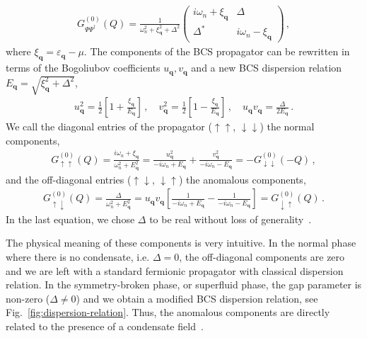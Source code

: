 \begin{align}
	\label{eq:bcs-propagator}
	G^{(0)}_{\Psi\Psi^{\dagger}}(Q) = \frac{1}{\omega_n^2+\xi_{\bm{q}}^2+\Delta^2}
	\begin{pmatrix} i\omega_n+\xi_{\bm{q}} & \Delta \\
	\Delta^* & i\omega_n-\xi_{\bm{q}} \end{pmatrix} \,,
\end{align}
where $\xi_{\bm{q}}=\varepsilon_{\bm{q}}-\mu$. The components of the BCS propagator can be rewritten in terms of the Bogoliubov coefficients $u_{\bm{q}}, v_{\bm{q}}$ and a new BCS dispersion relation $E_{\bm{q}}=\sqrt{\xi_{\bm{q}}^2+\Delta^2}$,
%
\begin{align}
	\label{eq:bogoliubov-coefficients}
	u_{\bm{q}}^2 = \frac{1}{2}\left[1 + \frac{\xi_{\bm{q}}}{E_{\bm{q}}}\right] \,, \quad
	v_{\bm{q}}^2 = \frac{1}{2}\left[1 - \frac{\xi_{\bm{q}}}{E_{\bm{q}}}\right] \,, \quad
	u_{\bm{q}} v_{\bm{q}} = \frac{\Delta}{2E_{\bm{q}}} \,.
\end{align}
%
We call the diagonal entries of the propagator ($\uparrow\uparrow$, $\downarrow\downarrow$) the normal components,
%
\begin{align}
	\label{eq:normal-components}
	G^{(0)}_{\uparrow\uparrow}(Q) = \frac{i\omega_n+\xi_{\bm{q}}}{\omega_n^2+E_{\bm{q}}^2} = \frac{u_{\bm{q}}^2}{-i\omega_n+E_{\bm{q}}} + \frac{v_{\bm{q}}^2}{-i\omega_n-E_{\bm{q}}}	= - G^{(0)}_{\downarrow\downarrow}(-Q) \,,
\end{align}
%
and the off-diagonal entries ($\uparrow\downarrow$, $\downarrow\uparrow$) the anomalous components,
%
\begin{align}
	\label{eq:anomalous-components}
	G^{(0)}_{\uparrow\downarrow}(Q) = \frac{\Delta}{\omega_n^2+E_{\bm{q}}^2} = u_{\bm{q}} v_{\bm{q}}
	\left[\frac{1}{-i\omega_n+E_{\bm{q}}} - \frac{1}{-i\omega_n-E_{\bm{q}}}\right] = G^{(0)}_{\downarrow\uparrow}(Q) \,.
\end{align}
%
In the last equation, we chose $\Delta$ to be real without loss of generality~\cite{Fetter1971}.

The physical meaning of these components is very intuitive. In the normal phase where there is no condensate, i.e. $\Delta=0$, the off-diagonal components are zero and we are left with a standard fermionic propagator with classical dispersion relation. In the symmetry-broken phase, or superfluid phase, the gap parameter is non-zero ($\Delta\neq 0$) and we obtain a modified BCS dispersion relation, see Fig.~\ref{fig:dispersion-relation}. Thus, the anomalous components are directly related to the presence of a condensate field~\cite{Fetter1971}.

